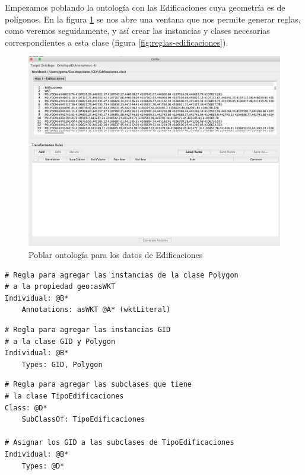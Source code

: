 Empezamos poblando la ontología con las Edificaciones cuya geometría es de polígonos. En la figura \ref{fig:edificaciones1} se nos abre una ventana que nos permite generar reglas, como veremos seguidamente, y así crear las instancias y clases necesarias correspondientes a esta clase (figura \ref{fig:reglas-edificaciones}).

\begin{figure}[H]
	\centering
	\includegraphics[width=1\linewidth]{imagenes/capitulo5/edificaciones1}
	\caption{Poblar ontología para los datos de Edificaciones}
	\label{fig:edificaciones1}
\end{figure}

\begin{lstlisting}
# Regla para agregar las instancias de la clase Polygon
# a la propiedad geo:asWKT 
Individual: @B*
	Annotations: asWKT @A* (wktLiteral)
\end{lstlisting}

\begin{lstlisting}
# Regla para agregar las instancias GID 
# a la clase GID y Polygon
Individual: @B*
	Types: GID, Polygon
\end{lstlisting}

\begin{lstlisting}
# Regla para agregar las subclases que tiene 
# la clase TipoEdificaciones 
Class: @D*
	SubClassOf: TipoEdificaciones

# Asignar los GID a las subclases de TipoEdificaciones
Individual: @B*
	Types: @D*
\end{lstlisting}

